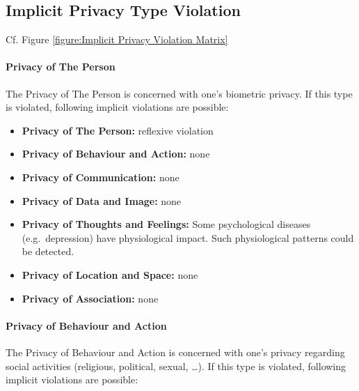 \subsection{Implicit Privacy Type Violation}

Cf. Figure \ref{figure:Implicit Privacy Violation Matrix}



\paragraph*{Privacy of The Person}

The Privacy of The Person is concerned with one's biometric privacy. If
this type is violated, following implicit violations are possible:

\begin{itemize}

\item
  \textbf{Privacy of The Person:} reflexive violation
\item
  \textbf{Privacy of Behaviour and Action:} none
\item
  \textbf{Privacy of Communication:} none
\item
  \textbf{Privacy of Data and Image:} none
\item
  \textbf{Privacy of Thoughts and Feelings:} Some psychological diseases
  (e.g.~depression) have physiological impact. Such physiological
  patterns could be detected.
\item
  \textbf{Privacy of Location and Space:} none
\item
  \textbf{Privacy of Association:} none
\end{itemize}

\paragraph*{Privacy of Behaviour and Action}

The Privacy of Behaviour and Action is concerned with one's privacy
regarding social activities (religious, political, sexual, \ldots{}). If
this type is violated, following implicit violations are possible:

